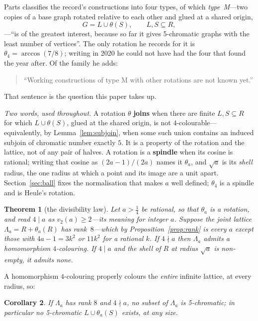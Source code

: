 \documentclass[11pt,reqno]{amsart}
\theoremstyle{plain}
\newtheorem{theorem}{Theorem}
\newtheorem{corollary}[theorem]{Corollary}
\theoremstyle{definition}
\newcommand{\Lat}{R}
\newcommand{\Lam}{\Lambda}
\begin{document}
Parts \cite{Parts} classifies the record's constructions into four types, of
which \emph{type~M}---two copies of a base graph rotated relative to each other
and glued at a shared origin,
\[
  G = L \cup \theta(S), \qquad L, S \subseteq \Lat,
\]
---``is of the greatest interest, because so far it gives 5-chromatic graphs
with the least number of vertices''. The only rotation he records for it is
$\theta_4 = \arccos(7/8)$; writing in 2020 he could not have had the four that
\cite{Voronov} found the year after. Of the family he adds:
\begin{quote}
``Working constructions of type M with other rotations are not known yet.''
\end{quote}
That sentence is the question this paper takes up.

\emph{Two words, used throughout.} A rotation $\theta$ \textbf{joins} when there
are finite $L, S \subseteq \Lat$ for which $L \cup \theta(S)$, glued at the
shared origin, is not $4$-colourable---equivalently, by
Lemma~\ref{lem:subjoin}, when some such union contains an induced subjoin of
chromatic number exactly $5$. It is a property of the rotation and the lattice,
not of any pair of halves. A rotation is a \textbf{spindle} when its cosine is
rational; writing that cosine as $(2a-1)/(2a)$ names it $\theta_a$, and $\sqrt a$
is its \emph{shell} radius, the one radius at which a point and its image are a
unit apart. Section~\ref{sec:ball} fixes the normalisation that makes $a$ well
defined; $\theta_4$ is a spindle and is Heule's rotation.

\begin{theorem}[the divisibility law]\label{thm:law}
Let $a > \tfrac14$ be rational, so that $\theta_a$ is a rotation, and read
$4 \mid a$ as $v_2(a) \ge 2$---its meaning for integer $a$. Suppose the joint
lattice $\Lam_a = \Lat + \theta_a(\Lat)$ has rank~$8$---which by
Proposition~\ref{prop:rank} is every $a$ except those with $4a-1 = 3k^2$ or
$11k^2$ for a rational $k$. If $4 \nmid a$ then $\Lam_a$ admits a homomorphism
$4$-colouring. If $4 \mid a$ and the shell of $\Lat$ at radius $\sqrt a$ is
non-empty, it admits none.
\end{theorem}

A homomorphism $4$-colouring properly colours the \emph{entire} infinite lattice,
at every radius, so:

\begin{corollary}\label{cor:kill}
If $\Lam_a$ has rank $8$ and $4 \nmid a$, no subset of $\Lam_a$ is 5-chromatic;
in particular no 5-chromatic $L \cup \theta_a(S)$ exists, at any size.
\end{corollary}
\end{document}
